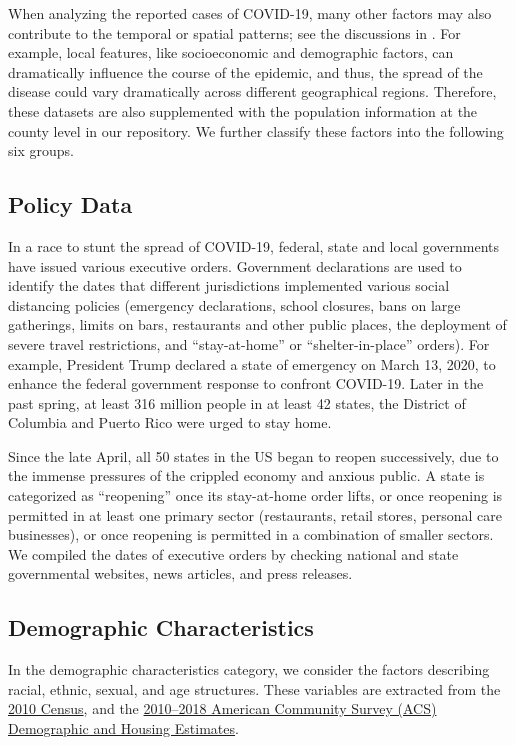 \documentclass[]{book}
\begin{document}
When analyzing the reported cases of COVID-19, many other factors may
also contribute to the temporal or spatial patterns; see the discussions
in \citep{wang:2020:comparing}. For example, local features, like
socioeconomic and demographic factors, can dramatically influence the
course of the epidemic, and thus, the spread of the disease could vary
dramatically across different geographical regions. Therefore, these
datasets are also supplemented with the population information at the
county level in our repository. We further classify these factors into
the following six groups.

\subsection{Policy Data}\label{policy-data}

In a race to stunt the spread of COVID-19, federal, state and local
governments have issued various executive orders. Government
declarations are used to identify the dates that different jurisdictions
implemented various social distancing policies (emergency declarations,
school closures, bans on large gatherings, limits on bars, restaurants
and other public places, the deployment of severe travel restrictions,
and ``stay-at-home'' or ``shelter-in-place'' orders). For example,
President Trump declared a state of emergency on March 13, 2020, to
enhance the federal government response to confront COVID-19. Later in
the past spring, at least 316 million people in at least 42 states, the
District of Columbia and Puerto Rico were urged to stay home.

Since the late April, all 50 states in the US began to reopen
successively, due to the immense pressures of the crippled economy and
anxious public. A state is categorized as ``reopening'' once its
stay-at-home order lifts, or once reopening is permitted in at least one
primary sector (restaurants, retail stores, personal care businesses),
or once reopening is permitted in a combination of smaller sectors. We
compiled the dates of executive orders by checking national and state
governmental websites, news articles, and press releases.

\subsection{Demographic
Characteristics}\label{demographic-characteristics}

In the demographic characteristics category, we consider the factors
describing racial, ethnic, sexual, and age structures. These variables
are extracted from the
\href{https://data.census.gov/cedsci/table?q=urban\%20rate\&hidePreview=false\&tid=DECENNIALSF12010.H2\&vintage=2010}{2010
Census}, and the
\href{https://data.census.gov/cedsci/table?q=population\%20density\&hidePreview=false\&tid=ACSDP1Y2018.DP05\&vintage=2018}{2010--2018
American Community Survey (ACS) Demographic and Housing Estimates}.
\end{document}

